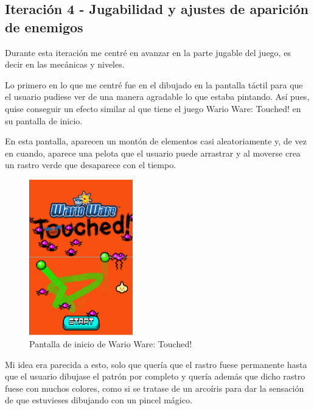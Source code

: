 \vspace{0.5cm}

\subsection{Iteración 4 - Jugabilidad y ajustes de aparición de enemigos}

Durante esta iteración me centré en avanzar en la parte jugable del juego, es decir en las mecánicas y niveles.

\vspace{0.5cm}

Lo primero en lo que me centré fue en el dibujado en la pantalla táctil para que el usuario pudiese ver de una manera agradable lo que estaba pintando. Así pues, quise conseguir un efecto similar al que tiene el juego Wario Ware: Touched! en su pantalla de inicio.

\vspace{0.5cm}

En esta pantalla, aparecen un montón de elementos casi aleatoriamente y, de vez en cuando, aparece una pelota que el usuario puede arrastrar y al moverse crea un rastro verde que desaparece con el tiempo.

\clearpage
\begin{figure}[htbp]
\centering
  \includegraphics[width=0.4\textwidth]{archivos/wario_ware_draw.png}
  \caption{Pantalla de inicio de Wario Ware: Touched!}
  \label{fig:warioware_main_creen}
\end{figure}

\vspace{0.5cm}

Mi idea era parecida a esto, solo que quería que el rastro fuese permanente hasta que el usuario dibujase el patrón por completo y quería además que dicho rastro fuese con muchos colores, como si se tratase de un arcoíris para dar la sensación de que estuvieses dibujando con un pincel mágico.

